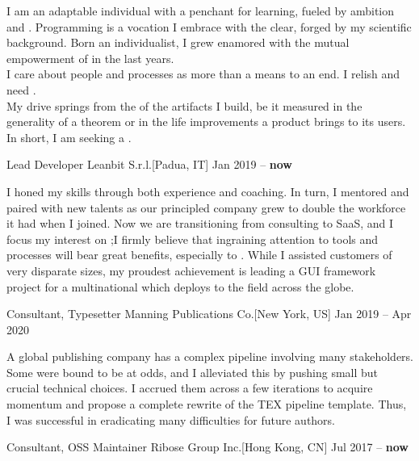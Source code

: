 \documentclass[9pt]{scrartcl}
\def\Phi{1.618}
\newlength{\Pad}\setlength{\Pad}{14.562pt} %
\begin{document}

I am an adaptable individual with a penchant for learning, fueled by ambition
and .
Programming is a vocation I embrace with the clear, 
forged by my scientific background.
Born an individualist, I grew enamored with the mutual empowerment of
 in the last years.\\[\smallskipamount]
I care about people and processes as more than a means to an end.
I relish and need .\\
My drive springs from the  of the artifacts I build, be
it measured in the generality of a theorem or in the life improvements a
product brings to its users. In short, I am seeking a .


\Event
  {Lead Developer}
  {Leanbit S.r.l.}[Padua, IT]
  {Jan 2019 -- \textbf{now}}

I honed my  skills through both experience and coaching. In
turn, I mentored and paired with new talents as our  principled company
grew to double the workforce it had when I joined.
%
Now we are transitioning from consulting to SaaS, and I focus my interest on
;\linebreak I firmly believe that ingraining attention to tools
and processes will bear great benefits, especially to .
%
While I assisted customers of very disparate sizes, my proudest achievement is
leading a GUI framework project for a multinational which deploys to the field
across the globe.

\smallskip

\Event
  {Consultant, Typesetter}
  {Manning Publications Co.}[New York, US]
  {Jan 2019 -- Apr 2020}

A global publishing company has a complex pipeline involving many stakeholders.
Some were bound to be at odds, and I alleviated this by pushing small but
crucial technical choices.
%
I  accrued them across a few iterations
to acquire momentum and propose a complete rewrite of the TEX pipeline template.
Thus, I was successful in eradicating many difficulties for future authors.

\smallskip

\Event
  {Consultant, OSS Maintainer}
  {Ribose Group Inc.}[Hong Kong, CN]
  {Jul 2017 -- \textbf{now}}
\end{document}
